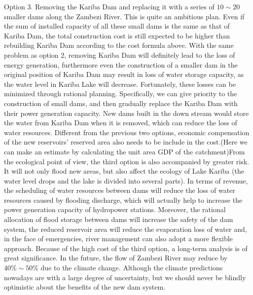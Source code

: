 \documentclass{mcmthesis}
\begin{document}
\indent Option 3. Removing the Kariba Dam and replacing it with a series of $10\sim20$ smaller dams along the Zambezi River. This is quite an ambitious plan. Even if the sum of installed capacity of all these small dams is the same as that of Kariba Dam, the total construction cost is still expected to be higher than rebuilding Kariba Dam according to the cost formula above. With the same problem as option 2, removing Kariba Dam will definitely lead to the loss of energy generation, furthermore even the construction of a smaller dam in the original position of Kariba Dam may result in loss of water storage capacity, as the water level in Kariba Lake will decrease. Fortunately, these losses can be minimized through rational planning. Specifically, we can give priority to the construction of small dams, and then gradually replace the Kariba Dam with their power generation capacity. New dams built in the down stream would store the water from Kariba Dam when it is removed, which can reduce the loss of water resources. Different from the previous two options, economic compensation of the new reservoirs' reserved area also needs to be include in the cost.(Here we can make an estimate by calculating the unit area GDP of the catchment)From the ecological point of view, the third option is also accompanied by greater risk. It will not only flood new areas, but also affect the ecology of Lake Kariba (the water level drops and the lake is divided into several parts). In terms of revenue, the scheduling of water resources between dams will reduce the loss of water resources caused by flooding discharge, which will actually help to increase the power generation capacity of hydropower stations. Moreover, the rational allocation of flood storage between dams will increase the safety of the dam system, the reduced reservoir area will reduce the evaporation loss of water and, in the face of emergencies, river management can also adopt a more flexible approach. Because of the high cost of the third option, a long-term analysis is of great significance. In the future, the flow of Zambezi River may reduce by $40\%\sim50\%$ due to the climate change. Although the climate predictions nowadays are with a large degree of uncertainty, but we should never be blindly optimistic about the benefits of the new dam system.\\


\end{document}
